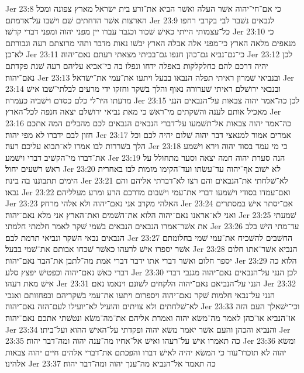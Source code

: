 Jer 23:8  כי אם־חי־יהוה אשׁר העלה ואשׁר הביא את־זרע בית ישׂראל מארץ צפונה ומכל הארצות אשׁר הדחתים שׁם וישׁבו על־אדמתם׃
Jer 23:9  לנבאים נשׁבר לבי בקרבי רחפו כל־עצמותי הייתי כאישׁ שׁכור וכגבר עברו יין מפני יהוה ומפני דברי קדשׁו׃
Jer 23:10  כי מנאפים מלאה הארץ כי־מפני אלה אבלה הארץ יבשׁו נאות מדבר ותהי מרוצתם רעה וגבורתם לא־כן׃
Jer 23:11  כי־גם־נביא גם־כהן חנפו גם־בביתי מצאתי רעתם נאם־יהוה׃
Jer 23:12  לכן יהיה דרכם להם כחלקלקות באפלה ידחו ונפלו בה כי־אביא עליהם רעה שׁנת פקדתם נאם־יהוה׃
Jer 23:13  ובנביאי שׁמרון ראיתי תפלה הנבאו בבעל ויתעו את־עמי את־ישׂראל׃
Jer 23:14  ובנבאי ירושׁלם ראיתי שׁערורה נאוף והלך בשׁקר וחזקו ידי מרעים לבלתי־שׁבו אישׁ מרעתו היו־לי כלם כסדם וישׁביה כעמרה׃
Jer 23:15  לכן כה־אמר יהוה צבאות על־הנבאים הנני מאכיל אותם לענה והשׁקתים מי־ראשׁ כי מאת נביאי ירושׁלם יצאה חנפה לכל־הארץ׃
Jer 23:16  כה־אמר יהוה צבאות אל־תשׁמעו על־דברי הנבאים הנבאים לכם מהבלים המה אתכם חזון לבם ידברו לא מפי יהוה׃
Jer 23:17  אמרים אמור למנאצי דבר יהוה שׁלום יהיה לכם וכל הלך בשׁררות לבו אמרו לא־תבוא עליכם רעה׃
Jer 23:18  כי מי עמד בסוד יהוה וירא וישׁמע את־דברו מי־הקשׁיב דברי וישׁמע׃
Jer 23:19  הנה סערת יהוה חמה יצאה וסער מתחולל על ראשׁ רשׁעים יחול׃
Jer 23:20  לא ישׁוב אף־יהוה עד־עשׂתו ועד־הקימו מזמות לבו באחרית הימים תתבוננו בה בינה׃
Jer 23:21  לא־שׁלחתי את־הנבאים והם רצו לא־דברתי אליהם והם נבאו׃
Jer 23:22  ואם־עמדו בסודי וישׁמעו דברי את־עמי וישׁבום מדרכם הרע ומרע מעלליהם׃
Jer 23:23  האלהי מקרב אני נאם־יהוה ולא אלהי מרחק׃
Jer 23:24  אם־יסתר אישׁ במסתרים ואני לא־אראנו נאם־יהוה הלוא את־השׁמים ואת־הארץ אני מלא נאם־יהוה׃
Jer 23:25  שׁמעתי את אשׁר־אמרו הנבאים הנבאים בשׁמי שׁקר לאמר חלמתי חלמתי׃
Jer 23:26  עד־מתי הישׁ בלב הנבאים נבאי השׁקר ונביאי תרמת לבם׃
Jer 23:27  החשׁבים להשׁכיח את־עמי שׁמי בחלומתם אשׁר יספרו אישׁ לרעהו כאשׁר שׁכחו אבותם את־שׁמי בבעל׃
Jer 23:28  הנביא אשׁר־אתו חלום יספר חלום ואשׁר דברי אתו ידבר דברי אמת מה־לתבן את־הבר נאם־יהוה׃
Jer 23:29  הלוא כה דברי כאשׁ נאם־יהוה וכפטישׁ יפצץ סלע׃
Jer 23:30  לכן הנני על־הנבאים נאם־יהוה מגנבי דברי אישׁ מאת רעהו׃
Jer 23:31  הנני על־הנביאם נאם־יהוה הלקחים לשׁונם וינאמו נאם׃
Jer 23:32  הנני על־נבאי חלמות שׁקר נאם־יהוה ויספרום ויתעו את־עמי בשׁקריהם ובפחזותם ואנכי לא־שׁלחתים ולא צויתים והועיל לא־יועילו לעם־הזה נאם־יהוה׃
Jer 23:33  וכי־ישׁאלך העם הזה או־הנביא או־כהן לאמר מה־משׂא יהוה ואמרת אליהם את־מה־משׂא ונטשׁתי אתכם נאם־יהוה׃
Jer 23:34  והנביא והכהן והעם אשׁר יאמר משׂא יהוה ופקדתי על־האישׁ ההוא ועל־ביתו׃
Jer 23:35  כה תאמרו אישׁ על־רעהו ואישׁ אל־אחיו מה־ענה יהוה ומה־דבר יהוה׃
Jer 23:36  ומשׂא יהוה לא תזכרו־עוד כי המשׂא יהיה לאישׁ דברו והפכתם את־דברי אלהים חיים יהוה צבאות אלהינו׃
Jer 23:37  כה תאמר אל־הנביא מה־ענך יהוה ומה־דבר יהוה׃
